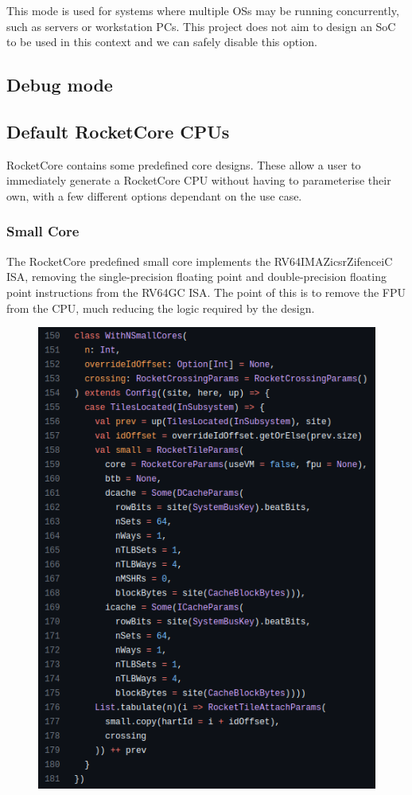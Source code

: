 This mode is used for systems where multiple OSs may be running concurrently, such as servers or workstation PCs. This project does not aim to design an SoC to be used in this context and we can safely disable this option.

\subsection{Debug mode}


\subsection{Default RocketCore CPUs}
RocketCore contains some predefined core designs. These allow a user to immediately generate a RocketCore CPU without having to parameterise their own, with a few different options dependant on the use case.

\subsubsection{Small Core}
The RocketCore predefined small core implements the RV64IMAZicsrZifenceiC ISA, removing the single-precision floating point and double-precision floating point instructions from the RV64GC ISA. The point of this is to remove the FPU from the CPU, much reducing the logic required by the design.

\begin{figure}
    \includegraphics[]{./img/rocketcore_default_small.png}
\end{figure}

